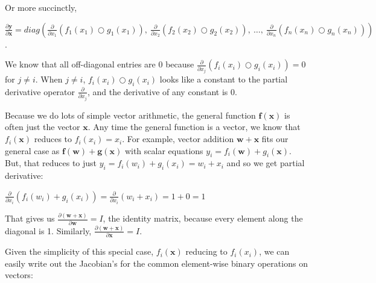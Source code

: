 \documentclass[11pt]{article}
\begin{document}
Or more succinctly,

$\frac{\partial \mathbf{y}}{\partial \mathbf{x}} = diag \left( \frac{\partial}{\partial x_1}(f_{1}(x_1) \bigcirc g_{1}(x_1)),~ \frac{\partial}{\partial x_2}(f_{2}(x_2) \bigcirc g_{2}(x_2)),~ \ldots,~ \frac{\partial}{\partial x_n}(f_{n}(x_n) \bigcirc g_{n}(x_n)) \right)$. 

We know that all off-diagonal entries are 0 because $\frac{\partial}{\partial x_j} ( f_i(x_i) \bigcirc g_i(x_i) ) = 0$ for $j \neq i$. When $j \neq i$, $f_i(x_i) \bigcirc g_i(x_i)$ looks like a constant to the partial derivative operator $\frac{\partial}{\partial x_j}$, and the derivative of any constant is 0.

Because we do lots of simple vector arithmetic, the general function $\mathbf{f(x)}$ is often just the vector $\mathbf{x}$.  Any time the general function is a vector, we know that $f_i(\mathbf{x})$ reduces to $f_i(x_i) = x_i$. For example, vector addition $\mathbf{w + x}$ fits our general case as $\mathbf{f(w)} + \mathbf{g(x)}$ with scalar equations $y_i = f_i(\mathbf{w}) + g_i(\mathbf{x})$. But, that reduces to just $y_i = f_i(w_i) + g_i(x_i) = w_i + x_i$ and so we get partial derivative:

$\frac{\partial}{\partial x_i} ( f_{i}(w_i) + g_{i}(x_i) ) = \frac{\partial}{\partial x_i}(w_i + x_i) = 1 + 0 = 1$

That gives us $\frac{\partial (\mathbf{w+x})}{\partial \mathbf{w}} = I$, the identity matrix, because every element along the diagonal is 1.  Similarly, $\frac{\partial (\mathbf{w+x})}{\partial \mathbf{x}} = I$.

Given the simplicity of this special case, $f_i(\mathbf{x})$ reducing to $f_i(x_i)$, we can easily write out the Jacobian's for the common element-wise binary operations on vectors:
\end{document}
